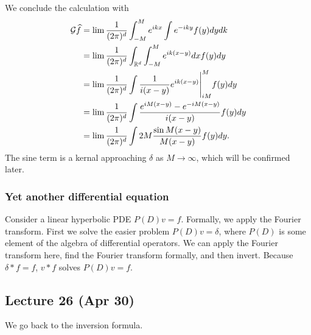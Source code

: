 \documentclass[10pt, twoside]{article}
\begin{document}
    We conclude the calculation with \begin{align*} \mathcal{G} \widehat{f} &= \lim
        \frac{1}{(2\pi)^d} \int_{-M}^M e^{ikx} \int e^{-iky} f(y) dy dk \\ &=
        \lim \frac{1}{(2\pi)^d} \int_{\mathbb{R}^d} \int_{-M}^M e^{ik(x-y)} dx f(y) dy
                                                                        \\ &=
                                                                        \lim
                                                                        \frac{1}{(2\pi)^d}
                                                                        \int
                                                                        \frac{1}{i(x-y)}e^{ik(x-y)}
                                                                        \Biggl\lvert_{iM}^M
                                                                            f(y)
                                                                            dy
                                                                            \\
                                                                           &=
    \lim \frac{1}{(2\pi)^d} \int \frac{e^{iM(x-y)} - e^{-iM(x-y)}}{i(x-y)} f(y)
    dy \\ &= \lim \frac{1}{(2\pi)^d} \int 2M \frac{\sin M(x-y)}{M(x-y)} f(y)
dy.  \end{align*} The sine term is a kernal approaching $\delta$ as $M \to
\infty$, which will be confirmed later.

    \subsubsection{Yet another differential equation} Consider a linear
    hyperbolic PDE $P(D)v = f$. Formally, we apply the Fourier transform. First
    we solve the easier problem $P(D)v = \delta$, where $P(D)$ is some element
    of the algebra of differential operators. We can apply the Fourier
    transform here, find the Fourier transform formally, and then invert.
    Because $\delta*f = f$, $v*f$ solves $P(D)v = f$.
    
    \subsection{Lecture 26 (Apr 30)} We go back to the inversion formula.
\end{document}
